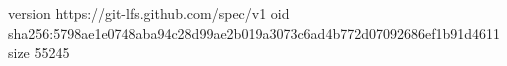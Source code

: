 version https://git-lfs.github.com/spec/v1
oid sha256:5798ae1e0748aba94c28d99ae2b019a3073c6ad4b772d07092686ef1b91d4611
size 55245
